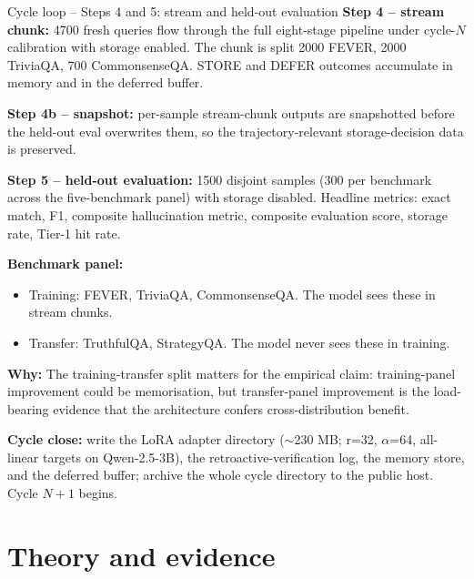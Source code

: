 \documentclass[10pt,aspectratio=169]{beamer}
\newcommand{\why}[1]{{\color{caemamber}\textbf{Why:}} #1}
\begin{document}
\begin{frame}{Cycle loop -- Steps 4 and 5: stream and held-out evaluation}
  \scriptsize
  \textbf{Step 4 -- stream chunk:} 4700 fresh queries flow through the full eight-stage pipeline under cycle-$N$ calibration with storage enabled. The chunk is split 2000 FEVER, 2000 TriviaQA, 700 CommonsenseQA. STORE and DEFER outcomes accumulate in memory and in the deferred buffer.

  \vspace{0.3em}
  \textbf{Step 4b -- snapshot:} per-sample stream-chunk outputs are snapshotted before the held-out eval overwrites them, so the trajectory-relevant storage-decision data is preserved.

  \vspace{0.3em}
  \textbf{Step 5 -- held-out evaluation:} 1500 disjoint samples (300 per benchmark across the five-benchmark panel) with storage disabled. Headline metrics: exact match, F1, composite hallucination metric, composite evaluation score, storage rate, Tier-1 hit rate.

  \vspace{0.4em}
  \textbf{Benchmark panel:}
  \begin{itemize}\scriptsize
    \item Training: FEVER, TriviaQA, CommonsenseQA. The model sees these in stream chunks.
    \item Transfer: TruthfulQA, StrategyQA. The model never sees these in training.
  \end{itemize}

  \why{The training-transfer split matters for the empirical claim: training-panel improvement could be memorisation, but transfer-panel improvement is the load-bearing evidence that the architecture confers cross-distribution benefit.}

  \textbf{Cycle close:} write the LoRA adapter directory ($\sim$230 MB; r=32, $\alpha$=64, all-linear targets on Qwen-2.5-3B), the retroactive-verification log, the memory store, and the deferred buffer; archive the whole cycle directory to the public host. Cycle $N{+}1$ begins.
\end{frame}

\section*{Theory and evidence}
\end{document}
